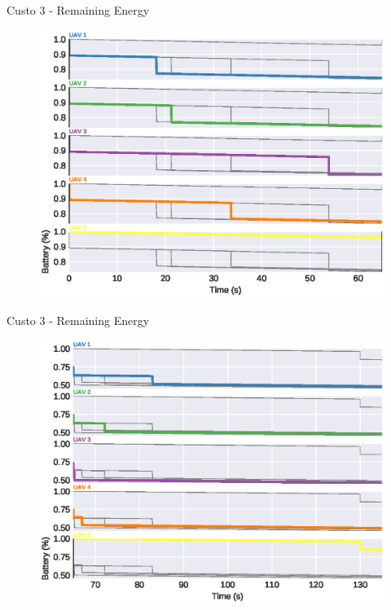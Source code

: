\begin{frame}{Custo 3 - Remaining Energy}
                    \begin{figure}[!htb]
                        \includegraphics[width=\textwidth]{custo_3/uav_remaining_energy_65.eps}
                    \end{figure}
                \end{frame}\begin{frame}{Custo 3 - Remaining Energy}
                    \begin{figure}[!htb]
                        \includegraphics[width=\textwidth]{custo_3/uav_remaining_energy_135.eps}
                    \end{figure}

\end{frame}
